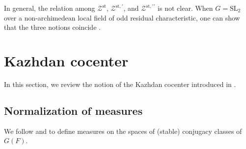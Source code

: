 \documentclass[iccmp]{ipbook}
\newcommand{\CZ}{{\mathcal {Z}}}
\newcommand{\SL}{{\mathrm{SL}}}
\newcommand{\st}{{\mathrm{st}}}
\def\p{\prime}
\begin{document}
In general, the relation among $\CZ^\st$, $\CZ^{\st,\p}$, and $\CZ^{\st,\p\p}$ is not clear. When $G=\SL_2$ over a non-archimedean local field of odd residual characteristic, one can show that the three notions coincide \cite[Prop.~3.5.3]{LN}.







\section{Kazhdan cocenter}\label{sec:KCC}



In this section, we review the notion of the Kazhdan cocenter introduced in \cite[\S 3]{LN}.


\subsection{Normalization of measures}\label{subsec:measures}

We follow \cite{FLN10} and \cite[\S 3.1]{LN} to define measures on the spaces of (stable) conjugacy classes of $G(F)$.
\end{document}
